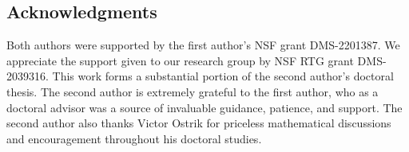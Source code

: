 \subsection{Acknowledgments}

Both authors were supported by the first author's NSF grant DMS-2201387. We appreciate the support given to our research group by NSF RTG grant DMS-2039316. This work forms a substantial portion of the second author's doctoral thesis. The second author is extremely grateful to the first author, who as a doctoral advisor was a source of invaluable guidance, patience, and support. The second author also thanks Victor Ostrik for priceless mathematical discussions and encouragement throughout his doctoral studies.





